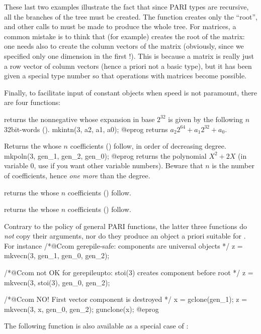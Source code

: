 These last two examples illustrate the fact that since PARI types are
recursive, all the branches of the tree must be created. The function
 creates only the ``root'', and other calls to  must be
made to produce the whole tree. For matrices, a common mistake is to think
that  (for example) creates the root of the
matrix: one needs also to create the column vectors of the matrix (obviously,
since we specified only one dimension in the first !). This is
because a matrix is really just a row vector of column vectors (hence a
priori not a basic type), but it has been given a special type number so that
operations with matrices become possible.

Finally, to facilitate input of constant objects when speed is not paramount,
there are four  functions:

returns the nonnegative  whose expansion in base $2^{32}$
is given by the following $n$ 32bit-words ().
\bprog
  mkintn(3, a2, a1, a0);
@eprog
\noindent returns $a_2 2^{64} + a_1 2^{32} + a_0$.

Returns the  whose $n$ coefficients () follow, in order of
decreasing degree.
\bprog
  mkpoln(3, gen_1, gen_2, gen_0);
@eprog
\noindent returns the polynomial $X^2 + 2X$ (in variable $0$, use
 if you want other variable numbers). Beware that $n$ is the
number of coefficients, hence \emph{one more} than the degree.

returns the  whose $n$ coefficients () follow.

returns the  whose $n$ coefficients () follow.

 Contrary to the policy of general PARI functions, the
latter three functions do \emph{not} copy their arguments, nor do they produce
an object a priori suitable for . For instance
\bprog
  /*@Ccom gerepile-safe: components are universal objects */
  z = mkvecn(3, gen_1, gen_0, gen_2);

  /*@Ccom not OK for gerepileupto: stoi(3) creates component before root */
  z = mkvecn(3, stoi(3), gen_0, gen_2);

  /*@Ccom NO! First vector component  is destroyed */
  x = gclone(gen_1);
  z = mkvecn(3, x, gen_0, gen_2);
  gunclone(x);
@eprog

\noindent The following function is also available as a special case of
:

